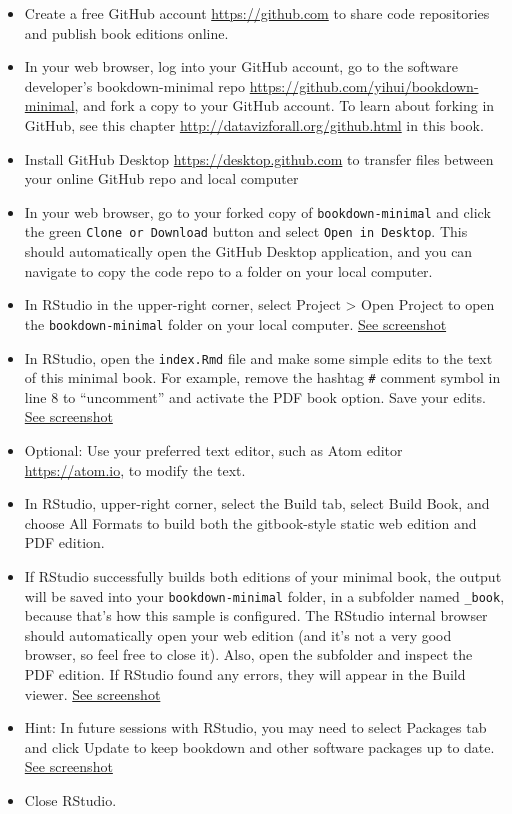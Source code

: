 \documentclass[
  english,
]{book}
\providecommand{\tightlist}{%
  \setlength{\itemsep}{0pt}\setlength{\parskip}{0pt}}
\begin{document}
\begin{itemize}
\tightlist
\item
  Create a free GitHub account \url{https://github.com} to share code repositories and publish book editions online.
\item
  In your web browser, log into your GitHub account, go to the software developer's bookdown-minimal repo \url{https://github.com/yihui/bookdown-minimal}, and fork a copy to your GitHub account. To learn about forking in GitHub, see this chapter \url{http://datavizforall.org/github.html} in this book.
\item
  Install GitHub Desktop \url{https://desktop.github.com} to transfer files between your online GitHub repo and local computer
\item
  In your web browser, go to your forked copy of \texttt{bookdown-minimal} and click the green \texttt{Clone\ or\ Download} button and select \texttt{Open\ in\ Desktop}. This should automatically open the GitHub Desktop application, and you can navigate to copy the code repo to a folder on your local computer.
\item
  In RStudio in the upper-right corner, select Project \textgreater{} Open Project to open the \texttt{bookdown-minimal} folder on your local computer. \href{images/15-bookdown/8-project-open.png}{See screenshot}
\item
  In RStudio, open the \texttt{index.Rmd} file and make some simple edits to the text of this minimal book. For example, remove the hashtag \texttt{\#} comment symbol in line 8 to ``uncomment'' and activate the PDF book option. Save your edits. \href{images/15-bookdown/9-edit-book.png}{See screenshot}
\item
  Optional: Use your preferred text editor, such as Atom editor \url{https://atom.io}, to modify the text.
\item
  In RStudio, upper-right corner, select the Build tab, select Build Book, and choose All Formats to build both the gitbook-style static web edition and PDF edition.
\item
  If RStudio successfully builds both editions of your minimal book, the output will be saved into your \texttt{bookdown-minimal} folder, in a subfolder named \texttt{\_book}, because that's how this sample is configured. The RStudio internal browser should automatically open your web edition (and it's not a very good browser, so feel free to close it). Also, open the subfolder and inspect the PDF edition. If RStudio found any errors, they will appear in the Build viewer. \href{images/15-bookdown/11-successful-build.png}{See screenshot}
\item
  Hint: In future sessions with RStudio, you may need to select Packages tab and click Update to keep bookdown and other software packages up to date. \href{images/15-bookdown/12-packages-update.png}{See screenshot}
\item
  Close RStudio.
\end{itemize}
\end{document}
